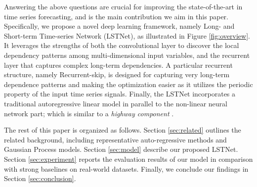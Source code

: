 Answering the above questions are crucial for improving the state-of-the-art in time series forecasting, and is the main contribution we aim in this paper.  Specifically, we propose a novel deep learning framework, namely Long- and Short-term Time-series Network (LSTNet), as illustrated in Figure \ref{fig:overview}. It leverages the strengths of both the convolutional layer to discover the local dependency patterns among multi-dimensional input variables, and the recurrent layer that captures complex long-term dependencies. A particular recurrent structure, namely Recurrent-skip, is designed for capturing very long-term dependence patterns and making the optimization easier as it utilizes the periodic property of the input time series signals. Finally, the LSTNet incorporates a traditional autoregressive linear model in parallel to the non-linear neural network part; which is similar to a \textit{highway component} \cite{srivastava2015highway}. 

The rest of this paper is organized as follows. Section \ref{sec:related} outlines the related background, including representative auto-regressive methods and Gaussian Process models. Section \ref{sec:model} describe our proposed LSTNet. Section \ref{sec:experiment} reports the evaluation results of our model in comparison with strong baselines on real-world datasets. Finally, we conclude our findings in Section \ref{sec:conclusion}.
       
     